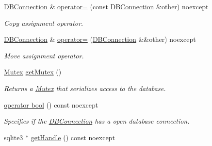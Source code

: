 \begin{DoxyCompactItemize}
\hyperlink{a00004}{D\-B\-Connection} \& \hyperlink{a00004_abf18d7c37cf19fe46af7b6c7c0f0e8f2}{operator=} (const \hyperlink{a00004}{D\-B\-Connection} \&other) noexcept
\begin{DoxyCompactList}\small\item\em Copy assignment operator. \end{DoxyCompactList}\item 
\hyperlink{a00004}{D\-B\-Connection} \& \hyperlink{a00004_a2d10766ea45bfb79f4959e62d432feeb}{operator=} (\hyperlink{a00004}{D\-B\-Connection} \&\&other) noexcept
\begin{DoxyCompactList}\small\item\em Move assignment operator. \end{DoxyCompactList}\item 
\hyperlink{a00009}{Mutex} \hyperlink{a00004_afd4961c42310aebf750d28d3487a9425}{get\-Mutex} ()
\begin{DoxyCompactList}\small\item\em Returns a \hyperlink{a00009}{Mutex} that serializes access to the database. \end{DoxyCompactList}\item 
\hyperlink{a00004_a794e7d4d92aa19bd67f3cff4aaf50020}{operator bool} () const noexcept
\begin{DoxyCompactList}\small\item\em Specifies if the \hyperlink{a00004}{D\-B\-Connection} has a open database connection. \end{DoxyCompactList}\item 
\hypertarget{a00004_a33f0b378dc147a3b2ff947e23994f71c}{sqlite3 $\ast$ \hyperlink{a00004_a33f0b378dc147a3b2ff947e23994f71c}{get\-Handle} () const noexcept}\label{a00004_a33f0b378dc147a3b2ff947e23994f71c}


\end{DoxyCompactItemize}
